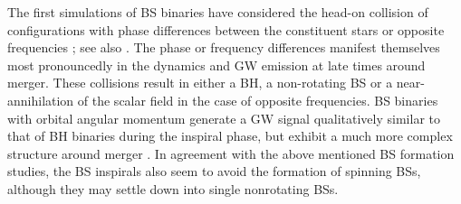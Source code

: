 The first simulations of BS binaries have considered the
head-on collision of configurations with phase differences
between the constituent stars or opposite frequencies
\cite{Palenzuela:2006wp}; see also
\cite{Choptuik:2009ww,Bezares:2017mzk}.
The phase or frequency differences manifest themselves most
pronouncedly in the dynamics and GW emission at late times
around merger. These collisions result in either
a BH, a non-rotating BS or a near-annihilation of the scalar
field in the case of opposite frequencies. BS binaries
with orbital angular momentum generate a GW signal
qualitatively similar to that of BH binaries during the
inspiral phase, but exhibit a much more complex structure around
merger \cite{Palenzuela:2007dm,Palenzuela:2017kcg}.
In agreement with the above mentioned BS formation 
studies, the BS inspirals also seem to avoid the formation
of spinning BSs, although they may settle down into
single nonrotating BSs.

